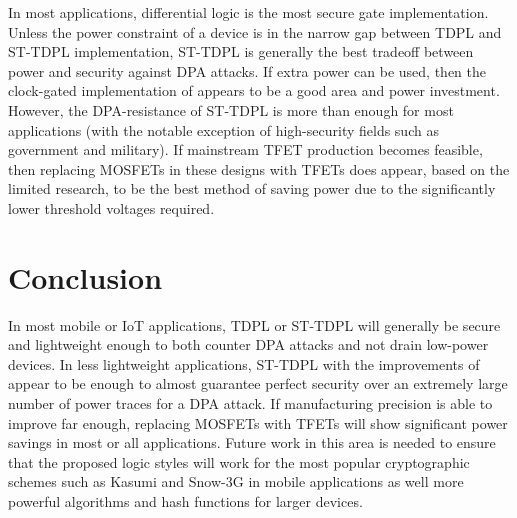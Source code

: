\documentclass[conference, 12pt]{IEEEtran}
\begin{document}
		In most applications, differential logic is the most secure gate implementation. Unless the power constraint of a device is in the narrow gap between TDPL and ST-TDPL implementation, ST-TDPL is generally the best tradeoff between power and security against DPA attacks. If extra power can be used, then the clock-gated implementation of \cite{b5} appears to be a good area and power investment. However, the DPA-resistance of ST-TDPL is more than enough for most applications (with the notable exception of high-security fields such as government and military). If mainstream TFET production becomes feasible, then replacing MOSFETs in these designs with TFETs does appear, based on the limited research, to be the best method of saving power due to the significantly lower threshold voltages required. 

	\section{Conclusion}
		In most mobile or IoT applications, TDPL or ST-TDPL will generally be secure and lightweight enough to both counter DPA attacks and not drain low-power devices. In less lightweight applications, ST-TDPL with the improvements of \cite{b5} appear to be enough to almost guarantee perfect security over an extremely large number of power traces for a DPA attack. If manufacturing precision is able to improve far enough, replacing MOSFETs with TFETs will show significant power savings in most or all applications. Future work in this area is needed to ensure that the proposed logic styles will work for the most popular cryptographic schemes such as Kasumi and Snow-3G in mobile applications as well more powerful algorithms and hash functions for larger devices.
\end{document}
